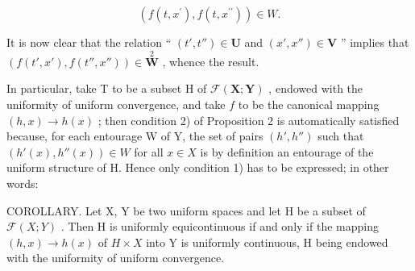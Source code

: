 \[
(f (t, x ^ {\prime}), f (t, x ^ {\prime \prime})) \in W.
\]

It is now clear that the relation `` \((t', t'') \in \mathbf{U}\) and \((x', x'') \in \mathbf{V}\) '' implies that \((f(t', x'), f(t'', x'')) \in \overset{2}{\mathbf{W}}\) , whence the result.

In particular, take T to be a subset H of \(\mathcal{F}(\mathbf{X};\mathbf{Y})\) , endowed with the uniformity of uniform convergence, and take \(f\) to be the canonical mapping \((h,x)\to h(x)\) ; then condition 2) of Proposition 2 is automatically satisfied because, for each entourage W of Y, the set of pairs \((h',h'')\) such that \((h'(x),h''(x))\in W\) for all \(x\in X\) is by definition an entourage of the uniform structure of H. Hence only condition 1) has to be expressed; in other words:

COROLLARY. Let X, Y be two uniform spaces and let H be a subset of \(\mathcal{F}(X;Y)\) . Then H is uniformly equicontinuous if and only if the mapping \((h,x) \to h(x)\) of \(H \times X\) into Y is uniformly continuous, H being endowed with the uniformity of uniform convergence.

